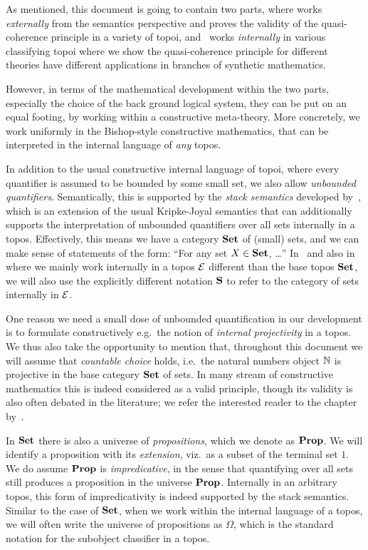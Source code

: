 As mentioned, this document is going to contain two parts, where  works \emph{externally} from the semantics perspective and proves the validity of the quasi-coherence principle in a variety of topoi, and~ works \emph{internally} in various classifying topoi where we show the quasi-coherence principle for different theories have different applications in branches of synthetic mathematics.

However, in terms of the mathematical development within the two parts, especially the choice of the back ground logical system, they can be put on an equal footing, by working within a constructive meta-theory. More concretely, we work uniformly in the Bishop-style constructive mathematics, that can be interpreted in the internal language of \emph{any} topos. 

In addition to the usual constructive internal language of topoi, where every quantifier is assumed to be bounded by some small set, we also allow \emph{unbounded quantifiers}. Semantically, this is supported by the \emph{stack semantics} developed by~\citet{shulman2010stack}, which is an extension of the usual Kripke-Joyal semantics that can additionally supports the interpretation of unbounded quantifiers over all sets internally in a topos. Effectively, this means we have a category $\mathbf{Set}$ of (small) sets, and we can make sense of statements of the form: ``For any set $X\in\mathbf{Set}$, \ldots'' In~ and also in~ where we mainly work internally in a topos $\mathcal{E}$ different than the base topos $\mathbf{Set}$, we will also use the explicitly different notation $\mathbf{S}$ to refer to the category of sets internally in $\mathcal{E}$.

One reason we need a small dose of unbounded quantification in our development is to formulate constructively e.g.\ the notion of \emph{internal projectivity} in a topos. We thus also take the opportunity to mention that, throughout this document we will assume that \emph{countable choice} holds, i.e.\ the natural numbers object $\mathbb{N}$ is projective in the base category $\mathbf{Set}$ of sets. In many stream of constructive mathematics this is indeed considered as a valid principle, though its validity is also often debated in the literature; we refer the interested reader to the chapter by~\citet{richman_countable}. 

In $\mathbf{Set}$ there is also a universe of \emph{propositions}, which we denote as $\mathbf{Prop}$. We will identify a proposition with its \emph{extension}, viz.\ as a subset of the terminal set $1$. We do assume $\mathbf{Prop}$ is \emph{impredicative}, in the sense that quantifying over all sets still produces a proposition in the universe $\mathbf{Prop}$. Internally in an arbitrary topos, this form of impredicativity is indeed supported by the stack semantics. Similar to the case of $\mathbf{Set}$, when we work within the internal language of a topos, we will often write the universe of propositions as $\Omega$, which is the standard notation for the subobject classifier in a topos.

